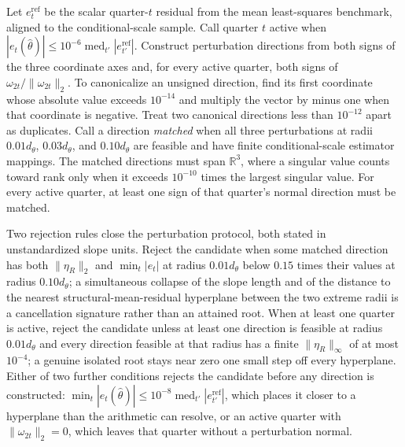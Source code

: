 \documentclass[11pt]{article}
\begin{document}
Let \(e_{t}^{\mathrm{ref}}\) be the scalar quarter-\(t\) residual from the mean least-squares
benchmark, aligned to the conditional-scale sample. Call quarter \(t\) active when
\(|e_t(\widehat\theta)|\le10^{-6}\operatorname{med}_{t'}|e_{t'}^{\mathrm{ref}}|\). Construct perturbation
directions from both signs of the three coordinate axes and, for every active quarter, both signs of
\(\omega_{2t}/\|\omega_{2t}\|_2\). To canonicalize an unsigned direction, find its first coordinate whose
absolute value exceeds \(10^{-14}\) and multiply the vector by minus one when that coordinate is
negative. Treat two canonical directions less than \(10^{-12}\) apart as duplicates. Call a
direction \emph{matched} when all three perturbations at radii
\(0.01d_\theta\), \(0.03d_\theta\), and \(0.10d_\theta\) are feasible and have finite conditional-scale estimator mappings.
The matched directions must span
\(\mathbb R^3\), where a singular value counts toward rank only when it exceeds \(10^{-10}\) times
the largest singular value. For every active quarter, at least one sign of that quarter's normal direction
must be matched.

Two rejection rules close the perturbation protocol, both stated in unstandardized
slope units. Reject the candidate when some matched direction has both \(\|\eta_R\|_2\) and
\(\min_t|e_t|\) at radius \(0.01d_\theta\) below \(0.15\) times their values at radius \(0.10d_\theta\);
a simultaneous collapse of the slope length and of the distance to the nearest
structural-mean-residual hyperplane between the two extreme radii is a cancellation signature rather
than an attained root. When at least one quarter is active, reject the candidate unless at least one
direction is feasible at radius \(0.01d_\theta\) and every direction feasible at that radius has a
finite \(\|\eta_R\|_\infty\) of at most \(10^{-4}\); a genuine isolated root stays near zero one small
step off every hyperplane. Either of two further conditions rejects the candidate before any
direction is constructed:
\(\min_t|e_t(\widehat\theta)|\le10^{-8}\operatorname{med}_{t'}|e_{t'}^{\mathrm{ref}}|\), which places
it closer to a hyperplane than the arithmetic can resolve, or an active quarter with
\(\|\omega_{2t}\|_2=0\), which leaves that quarter without a perturbation normal.
\end{document}
